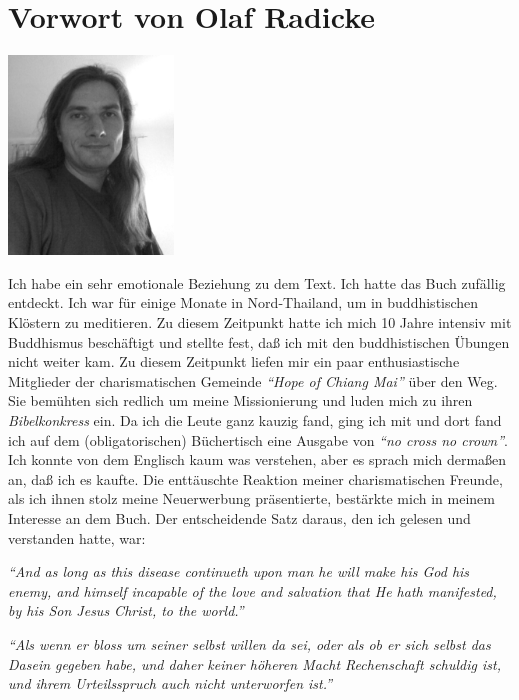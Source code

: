 \part{Vorwort von Olaf Radicke}


\begin{floatingfigure}[l]{0.33\textwidth}
\includegraphics[width=0.33\textwidth]{olaf_radicke_bw}
\end{floatingfigure}

Ich habe ein sehr emotionale Beziehung zu dem Text. Ich hatte das Buch zufällig
entdeckt. Ich war für einige Monate in Nord-Thailand, um in buddhistischen
Klöstern zu meditieren. Zu diesem Zeitpunkt hatte ich mich 10 Jahre intensiv mit
Buddhismus beschäftigt und stellte fest, daß ich mit den buddhistischen Übungen
nicht weiter kam. Zu diesem Zeitpunkt liefen mir ein paar enthusiastische
Mitglieder der charismatischen Gemeinde \textit{"`Hope of Chiang Mai"'} über
den Weg. Sie bemühten sich redlich um meine Missionierung und luden mich zu
ihren \textit{Bibelkonkress} ein. Da ich die Leute ganz kauzig fand, ging ich
mit und dort fand ich auf dem (obligatorischen) Büchertisch eine Ausgabe
von \textit{"`no cross no crown"'}.
Ich konnte von dem Englisch kaum was verstehen, aber es sprach mich dermaßen
an, daß ich es kaufte. Die enttäuschte Reaktion meiner charismatischen Freunde,
als ich ihnen stolz meine Neuerwerbung präsentierte, bestärkte mich in meinem
Interesse an dem Buch. Der entscheidende Satz daraus, den ich gelesen und
verstanden hatte, war:

\begin{center}
\parbox{7,5cm}{
\textit{"`And as long as this disease continueth upon man he will make his God
his enemy, and himself incapable of the love and salvation that He hath
manifested, by his Son Jesus Christ, to the world."'}

\medskip

\textit{"`Als wenn er bloss um seiner selbst willen da sei, oder als ob er
sich selbst das Dasein gegeben habe, und daher keiner höheren Macht Rechenschaft
schuldig ist, und ihrem Urteilsspruch auch nicht unterworfen ist."'}
}
\end{center}

